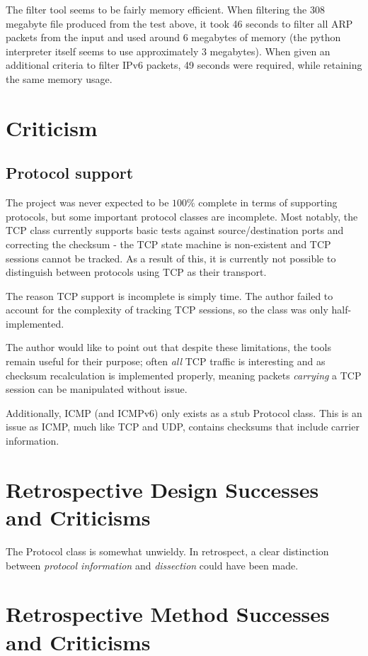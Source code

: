\documentclass[10pt,a4paper,notitlepage]{report}
\begin{document}
The filter tool seems to be fairly memory efficient. When filtering the 308 megabyte file produced from the test above, it took 46 seconds to filter all ARP packets from the input and used around 6 megabytes of memory (the python interpreter itself seems to use approximately 3 megabytes). When given an additional criteria to filter IPv6 packets, 49 seconds were required, while retaining the same memory usage.

\section{Criticism}
\subsection{Protocol support}
The project was never expected to be $100\%$ complete in terms of supporting protocols, but some important protocol classes are incomplete. Most notably, the TCP class currently supports basic tests against source/destination ports and correcting the checksum - the TCP state machine is non-existent and TCP sessions cannot be tracked. As a result of this, it is currently not possible to distinguish between protocols using TCP as their transport.

The reason TCP support is incomplete is simply time. The author failed to account for the complexity of tracking TCP sessions, so the class was only half-implemented.

The author would like to point out that despite these limitations, the tools remain useful for their purpose; often \emph{all} TCP traffic is interesting and as checksum recalculation is implemented properly, meaning packets \emph{carrying} a TCP session can be manipulated without issue.

Additionally, ICMP (and ICMPv6) only exists as a stub Protocol class. This is an issue as ICMP, much like TCP and UDP, contains checksums that include carrier information.

\section{Retrospective Design Successes and Criticisms}
The Protocol class is somewhat unwieldy. In retrospect, a clear distinction between \emph{protocol information} and \emph{dissection} could have been made.

\section{Retrospective Method Successes and Criticisms}
\end{document}
